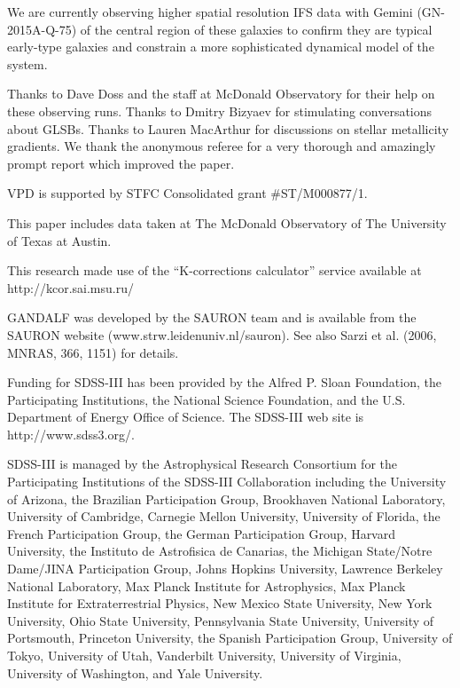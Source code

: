 \documentclass[12pt,preprint]{aastex}
\begin{document}
We are currently observing higher spatial resolution IFS data with Gemini (GN-2015A-Q-75) of the central region of these galaxies to confirm they are typical early-type galaxies and constrain a more sophisticated dynamical model of the system.

\acknowledgments
Thanks to Dave Doss and the staff at McDonald Observatory for their help on these observing runs. Thanks to Dmitry Bizyaev for stimulating conversations about GLSBs. Thanks to Lauren MacArthur for discussions on stellar metallicity gradients. We thank the anonymous referee for a very thorough and amazingly prompt report which improved the paper.

VPD is supported by STFC Consolidated grant \#ST/M000877/1.

This paper includes data taken at The McDonald Observatory of The University of Texas at Austin.

This research made use of the ``K-corrections calculator'' service available at http://kcor.sai.msu.ru/

GANDALF was developed by the SAURON team and is available from the SAURON website (www.strw.leidenuniv.nl/sauron). See also Sarzi et al. (2006, MNRAS, 366, 1151) for details.

Funding for SDSS-III has been provided by the Alfred P. Sloan Foundation, the Participating Institutions, the National Science Foundation, and the U.S. Department of Energy Office of Science. The SDSS-III web site is http://www.sdss3.org/.

SDSS-III is managed by the Astrophysical Research Consortium for the Participating Institutions of the SDSS-III Collaboration including the University of Arizona, the Brazilian Participation Group, Brookhaven National Laboratory, University of Cambridge, Carnegie Mellon University, University of Florida, the French Participation Group, the German Participation Group, Harvard University, the Instituto de Astrofisica de Canarias, the Michigan State/Notre Dame/JINA Participation Group, Johns Hopkins University, Lawrence Berkeley National Laboratory, Max Planck Institute for Astrophysics, Max Planck Institute for Extraterrestrial Physics, New Mexico State University, New York University, Ohio State University, Pennsylvania State University, University of Portsmouth, Princeton University, the Spanish Participation Group, University of Tokyo, University of Utah, Vanderbilt University, University of Virginia, University of Washington, and Yale University.
\end{document}
